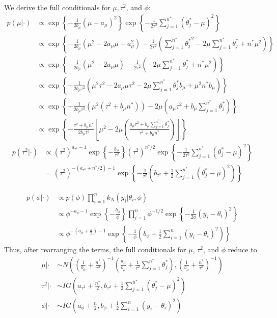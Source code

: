 \documentclass[a4paper, 10pt]{article}
\newcommand{\yi}{y_i}
\newcommand{\Smu}{\sumjn \startheta}
\newcommand{\sumjn}{\sum_{j=1}^{n^*}}
\newcommand{\nstar}{n^*}
\newcommand{\startheta}{\theta_j^*}
\newcommand{\thi}{\theta_i}
\newcommand{\tausq}{\tau^2}
\newcommand{\aphi}{a_\phi}
\newcommand{\bphi}{b_\phi}
\newcommand{\amu}{a_\mu}
\newcommand{\bmu}{b_\mu}
\newcommand{\atau}{a_{\tausq}}
\newcommand{\btau}{b_{\tausq}}
\newcommand{\parenth}[1]{\left(#1\right)}
\newcommand{\bkSquares}[1]{\left[#1\right]}
\newcommand{\curlies}[1]{ \left\{#1\right\} }
\begin{document}
\begin{enumerate}
\begin{enumerate}
        We derive the full conditionals for $\mu, \tausq$, and $\phi$:
        \begin{align*}
            p(\mu|\cdot) &\propto \exp \curlies{- \frac{1}{2\bmu}(\mu - \amu )^2} \exp \curlies{- \frac{1}{2\tausq} \sumjn (\startheta - \mu)^2}\\
                &\propto \exp \curlies{-\frac{1}{2\bmu}(\mu^2 - 2\amu\mu + \amu^2) - \frac{1}{2\tausq} \parenth{\sumjn {\startheta}^2 - 2\mu \sumjn \startheta + \nstar\mu^2 }}\\
                &\propto \exp \curlies{-\frac{1}{2\bmu} (\mu^2 - 2\amu \mu) -  \frac{1}{2\tausq} \parenth{ -2 \mu\Smu +\nstar\mu^2 } }\\
                &\propto \exp \curlies{ -\frac{1}{2\bmu \tausq} \parenth{\mu^2\tausq - 2\amu\mu\tausq - 2\mu \Smu \bmu +\mu^2\nstar \bmu } }\\
                &\propto \exp \curlies{ -\frac{1}{2\bmu \tausq} \parenth{\mu^2(\tausq +\bmu \nstar)} -2\mu\parenth{\amu\tausq +\bmu\Smu} } \\
                &\propto \exp \curlies{ - \frac{\tausq +\bmu\nstar}{2\bmu\tausq} \bkSquares{\mu^2 - 2\mu \parenth{\frac{\amu \tausq +\bmu\Smu }{\tausq +\bmu\nstar} } } }
        \end{align*}
        \begin{align*}
            p(\tausq|\cdot) &\propto (\tausq)^{\atau - 1} \exp \curlies{-\frac{\btau}{\tausq}} (\tausq)^{\nstar /2} \exp \curlies{- \frac{1}{2\tausq} \sumjn (\startheta - \mu)^2}\\
                &=(\tausq)^{-(\atau + \nstar/2) - 1} \exp\curlies{-\frac{1}{\tausq}\parenth{\btau + \frac{1}{2}\sumjn (\startheta - \mu)^2}}
        \end{align*}
        
        \begin{align*}
            p(\phi|\cdot) &\propto p(\phi) \prod_{i=1}^{n} k_N(\yi|\thi,\phi)\\
                &\propto \phi^{-\aphi - 1}\exp \curlies{- \frac{\bphi}{\phi}}\prod_{i=1}^n \phi^{-1/2} \exp \curlies{-\frac{1}{2\phi}(\yi-\thi)^2}\\
                &\propto \phi^{-(\aphi + \frac{n}{2})-1} \exp \curlies{-\frac{1}{\phi}\parenth{\bphi + \frac{1}{2} \sum_{i=1}^n (\yi - \thi)^2 } }
        \end{align*}
        Thus, after rearranging the terms, the full conditionals for $\mu$, $\tausq$, and $\phi$ reduce to
        \begin{align*}
            \mu|\cdot &\sim N\parenth{\parenth{\frac{1}{\bmu} + \frac{\nstar}{\tausq} }^{-1} \parenth{ \frac{\amu}{\bmu} + \frac{1}{\tausq} \sum_{j=1}^{\nstar} \startheta }, \parenth{\frac{1}{\bmu} + \frac{\nstar}{\tausq} }^{-1} }\\
            \tausq|\cdot &\sim IG \parenth{\atau + \frac{\nstar}{2}, \btau + \frac{1}{2}\sum_{j=1}^{\nstar} (\startheta - \mu)^2 }\\
            \phi|\cdot &\sim IG\parenth{\aphi + \frac{n}{2}, \bphi + \frac{1}{2} \sum_{i=1}^n (\yi -\thi)^2}
        \end{align*}
        

\end{enumerate}
\end{enumerate}
\end{document}
